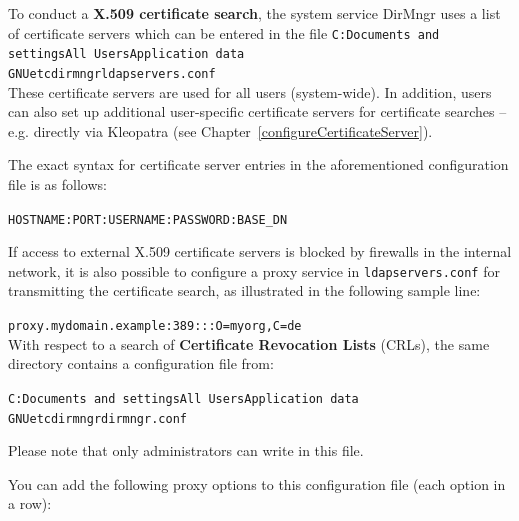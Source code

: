 \documentclass[a4paper,11pt,oneside,openright,titlepage]{scrbook}
\newcommand{\Filename}[1]{\small{\texttt{#1}}\normalsize}
\begin{document}
To conduct a \textbf{X.509 certificate search}, the system service
DirMngr uses a list of certificate servers which can be entered in the
file \newline
\Filename{C:\back{}Documents and settings\back{}All
Users\back{}Application data\back{}\\
GNU\back{}etc\back{}dirmngr\back{}ldapservers.conf}\\
These certificate servers are used for all users (system-wide). In
addition, users can also set up additional user-specific certificate
servers for certificate searches -- e.g. directly via Kleopatra (see
Chapter~\ref{configureCertificateServer}).

The exact syntax for certificate server entries in the aforementioned
configuration file is as follows:


\Filename{HOSTNAME:PORT:USERNAME:PASSWORD:BASE\_DN}

If access to external X.509 certificate servers is blocked by
firewalls in the internal network, it is also possible to configure a
proxy service in \Filename{ldapservers.conf} for
transmitting the certificate search, as illustrated in the following
sample line:

\Filename{proxy.mydomain.example:389:::O=myorg,C=de}\\

With respect to a search of \textbf{Certificate Revocation
Lists} (CRLs), the same directory
contains a configuration file from:

\Filename{C:\back{}Documents and settings\back{}All
Users\back{}Application data\back{}\\
GNU\back{}etc\back{}dirmngr\back{}dirmngr.conf}

Please note that only administrators can write in this file.

You can add the following proxy options to this configuration file
(each option in a row):
\end{document}
